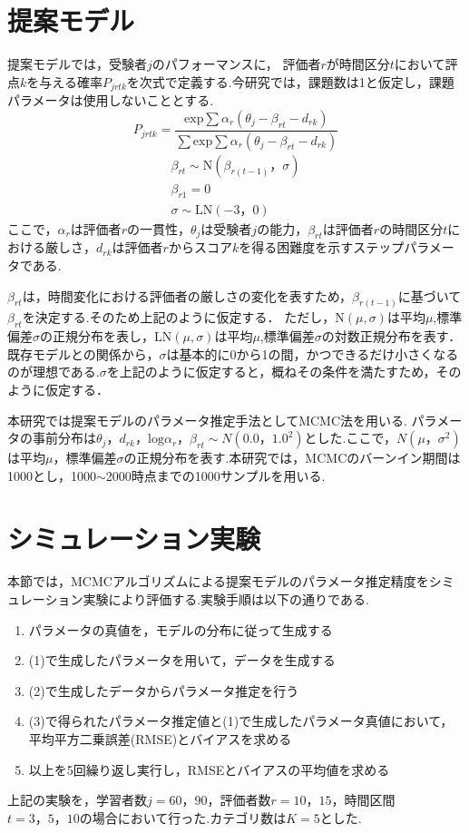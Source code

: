 \documentclass[twocolumn, a4paper]{hcresume}
\begin{document}
\section{提案モデル}
提案モデルでは，受験者$j$のパフォーマンスに， 評価者$r$が時間区分$t$において評点$k$を与える確率$P_{jrtk}$を次式で定義する.今研究では，課題数は1と仮定し，課題パラメータは使用しないこととする.
\begin{displaymath}
P_{jrtk}=\frac{\mathrm{exp}\sum{\alpha_r(\theta_{j}-\beta_{rt}-d_{rk})}}{\sum \mathrm{exp}\sum{\alpha_r(\theta_{j}-\beta_{rt}-d_{rk})}}
\end{displaymath}
\begin{eqnarray}
  \beta_{rt}\sim \mathrm{N}(\beta_{r(t-1)}，\sigma)\nonumber\\
  \beta_{r1} = 0\nonumber\\
  \sigma \sim \mathrm{LN}(-3，0)\nonumber
\end{eqnarray}
ここで，$\alpha_{r}$は評価者$r$の一貫性，$\theta_{j}$は受験者$j$の能力，$\beta_{rt}は$評価者$r$の時間区分$t$における厳しさ，$d_{rk}$は評価者$r$からスコア$k$を得る困難度を示すステップパラメータである.

$\beta_{rt}$は，時間変化における評価者の厳しさの変化を表すため，$\beta_{r(t-1)}$に基づいて$\beta_{rt}$を決定する.そのため上記のように仮定する．
ただし，$\mathrm{N}(\mu,\sigma)$は平均$\mu$,標準偏差$\sigma$の正規分布を表し，$\mathrm{LN}(\mu,\sigma)$は平均$\mu$,標準偏差$\sigma$の対数正規分布を表す．
既存モデルとの関係から，$\sigma$は基本的に0から1の間，かつできるだけ小さくなるのが理想である.$\sigma$を上記のように仮定すると，概ねその条件を満たすため，そのように仮定する．

本研究では提案モデルのパラメータ推定手法としてMCMC法を用いる. パラメータの事前分布は$\theta_{j}，d_{rk}，\mathrm{log}\alpha_{r}，\beta_{rt}\sim N(0.0，1.0^{2})$とした.ここで，$N(\mu，\sigma^2)$は平均$\mu$，標準偏差$\sigma$の正規分布を表す.本研究では，MCMCのバーンイン期間は1000とし，1000$\sim$2000時点までの1000サンプルを用いる.
\section{シミュレーション実験}

本節では，MCMCアルゴリズムによる提案モデルのパラメータ推定精度をシミュレーション実験により評価する.実験手順は以下の通りである.
\begin{enumerate}
\item パラメータの真値を，モデルの分布に従って生成する
\item (1)で生成したパラメータを用いて，データを生成する
\item (2)で生成したデータからパラメータ推定を行う
\item (3)で得られたパラメータ推定値と(1)で生成したパラメータ真値において，平均平方二乗誤差(RMSE)とバイアスを求める
\item 以上を5回繰り返し実行し，RMSEとバイアスの平均値を求める
\end{enumerate}
上記の実験を，学習者数$j=60，90$，評価者数$r=10，15$，時間区間$t=3，5，10$の場合において行った.カテゴリ数は$K=5$とした.
\end{document}
